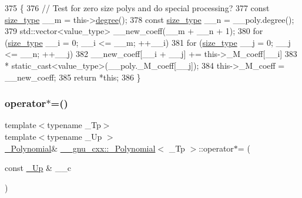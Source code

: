 \begin{DoxyCode}
375       \{
376         \textcolor{comment}{//  Test for zero size polys and do special processing?}
377         \textcolor{keyword}{const} \hyperlink{class____gnu__cxx_1_1__Polynomial_a8b25fcfd4acaad0c5c08b649c22da28a}{size\_type} \_\_m = this->\hyperlink{class____gnu__cxx_1_1__Polynomial_a07d9933aeeb9afbd823218ed921336cb}{degree}();
378         \textcolor{keyword}{const} \hyperlink{class____gnu__cxx_1_1__Polynomial_a8b25fcfd4acaad0c5c08b649c22da28a}{size\_type} \_\_n = \_\_poly.degree();
379         std::vector<value\_type> \_\_new\_coeff(\_\_m + \_\_n + 1);
380         \textcolor{keywordflow}{for} (\hyperlink{class____gnu__cxx_1_1__Polynomial_a8b25fcfd4acaad0c5c08b649c22da28a}{size\_type} \_\_i = 0; \_\_i <= \_\_m; ++\_\_i)
381           \textcolor{keywordflow}{for} (\hyperlink{class____gnu__cxx_1_1__Polynomial_a8b25fcfd4acaad0c5c08b649c22da28a}{size\_type} \_\_j = 0; \_\_j <= \_\_n; ++\_\_j)
382             \_\_new\_coeff[\_\_i + \_\_j] += this->\_M\_coeff[\_\_i]
383                                 * static\_cast<value\_type>(\_\_poly.\_M\_coeff[\_\_j]);
384         this->\_M\_coeff = \_\_new\_coeff;
385         \textcolor{keywordflow}{return} *\textcolor{keyword}{this};
386       \}
\end{DoxyCode}
\mbox{\label{class____gnu__cxx_1_1__Polynomial_a2797074d43a1746ced73122a0509a1ce}} 
\subsubsection{\texorpdfstring{operator$\ast$=()}{operator*=()}\hspace{0.1cm}{\footnotesize\ttfamily [2/3]}}
{\footnotesize\ttfamily template$<$typename \+\_\+\+Tp$>$ \\
template$<$typename \+\_\+\+Up $>$ \\
\hyperlink{class____gnu__cxx_1_1__Polynomial}{\+\_\+\+Polynomial}\& \hyperlink{class____gnu__cxx_1_1__Polynomial}{\+\_\+\+\_\+gnu\+\_\+cxx\+::\+\_\+\+Polynomial}$<$ \+\_\+\+Tp $>$\+::operator$\ast$= (\begin{DoxyParamCaption}\item[{const \hyperlink{class____gnu__cxx_1_1__Polynomial_a242114d4b86648a5dff67a8221f80d40}{\+\_\+\+Up} \&}]{\+\_\+\+\_\+c }\end{DoxyParamCaption})\hspace{0.3cm}{\ttfamily [inline]}}

